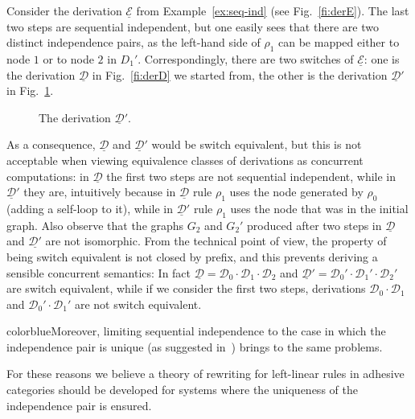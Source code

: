 \documentclass[a4paper,UKenglish,cleveref,pdftex,thm-restate,numberwithinsect]{lipics-v2021}
\newcommand{\full}[1]{{color{blue}#1}}
\newcommand{\full}[1]{}
\newcommand{\dder}[1]{\mathscr{#1}}
\newcommand{\der}[1]{\underline{\dder{#1}}}
\begin{document}
\begin{example}
  Consider the derivation $\der{E}$ from Example~\ref{ex:seq-ind} (see Fig.~\ref{fi:derE}).
  The last two steps are sequential independent, but one easily sees
  that there are two distinct independence pairs, as the left-hand side
  of $\rho_1$ can be mapped either to node $1$ or to node
  $2$ in $D_1'$. Correspondingly, there
  are two switches of $\der{E}$: one is the derivation $\der{D}$ in
  Fig.~\ref{fi:derD} we started from, the other is the derivation
  $\der{D}'$ in Fig.~\ref{fi:derD1}.
  
  \begin{figure}
    
    \caption{The derivation $\der{D}'$.}
    \label{fi:derD1}
  \end{figure}
  
  As a consequence, $\der{D}$ and $\der{D}'$ would be switch
  equivalent, but this is not acceptable when viewing equivalence
  classes of derivations as concurrent computations: in $\der{D}$ the
  first two steps are not sequential independent, while in $\der{D}'$
  they are, intuitively because in $\der{D}$ rule $\rho_1$ uses the
  node generated by $\rho_0$ (adding a self-loop to it), while in
  $\der{D}'$ rule $\rho_1$ uses the node that was in the initial
  graph. Also observe that the graphs $G_2$ and $G_2'$ produced after
  two steps in $\der{D}$ and $\der{D'}$ are not isomorphic. From the
  technical point of view, the property of being switch equivalent is
  not closed by prefix, and this prevents deriving a sensible
  concurrent semantics: In fact
  $\der{D} = \dder{D}_0\cdot \dder{D}_1 \cdot \dder{D}_2$ and
  $\der{D}' = \dder{D}_0'\cdot \dder{D}_1' \cdot \dder{D}_2'$ are
  switch equivalent, while if we consider the first two steps,
  derivations $\dder{D}_0 \cdot \dder{D}_1$ and
  $\dder{D}_0' \cdot \dder{D}_1'$ are not switch equivalent.
\end{example} 

\full{Moreover, limiting sequential independence to the case in which the independence
pair is unique (as suggested in~\cite{baldan2017domains}) brings to the same problems.}

For these reasons we believe a theory of rewriting for
left-linear rules in adhesive categories should be developed for
systems where the uniqueness of the independence pair is ensured.
\end{document}
